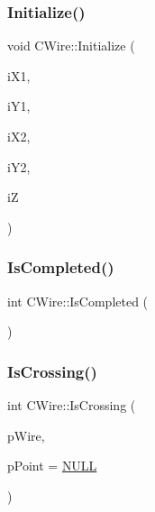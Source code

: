 \mbox{\label{classCWire_ab32c9734c1bb70f9aecb90be922d63fe}} 
\subsubsection{\texorpdfstring{Initialize()}{Initialize()}\hspace{0.1cm}{\footnotesize\ttfamily [3/3]}}
{\footnotesize\ttfamily void C\+Wire\+::\+Initialize (\begin{DoxyParamCaption}\item[{int}]{i\+X1,  }\item[{int}]{i\+Y1,  }\item[{int}]{i\+X2,  }\item[{int}]{i\+Y2,  }\item[{int}]{iZ }\end{DoxyParamCaption})}

\mbox{\label{classCWire_a1b37fb9ea32af4a838620a368b9f3824}} 
\subsubsection{\texorpdfstring{IsCompleted()}{IsCompleted()}}
{\footnotesize\ttfamily int C\+Wire\+::\+Is\+Completed (\begin{DoxyParamCaption}{ }\end{DoxyParamCaption})}

\mbox{\label{classCWire_a961f580e533277ae6c618f52f4c105e0}} 
\subsubsection{\texorpdfstring{IsCrossing()}{IsCrossing()}}
{\footnotesize\ttfamily int C\+Wire\+::\+Is\+Crossing (\begin{DoxyParamCaption}\item[{\mbox{\hyperlink{classCWire}{C\+Wire}} $\ast$}]{p\+Wire,  }\item[{\mbox{\hyperlink{classCPoint}{C\+Point}} $\ast$}]{p\+Point = {\ttfamily \mbox{\hyperlink{BoxRouter_8h_a070d2ce7b6bb7e5c05602aa8c308d0c4}{N\+U\+LL}}} }\end{DoxyParamCaption})}

